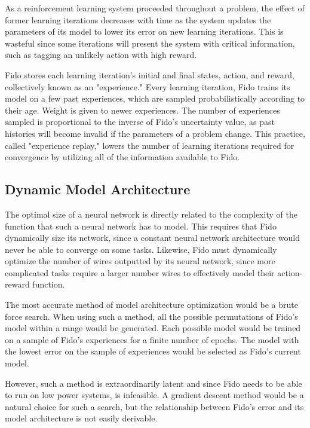 As a reinforcement learning system proceeded throughout a problem, the effect of former learning iterations decreases with time as the system updates the parameters of its model to lower its error on new learning iterations. This is wasteful since some iterations will present the system with critical information, such as tagging an unlikely action with high reward.

Fido stores each learning iteration's initial and final states, action, and reward, collectively known as an "experience." Every learning iteration, Fido trains its model on a few past experiences, which are sampled probabilistically according to their age. Weight is given to newer experiences. The number of experiences sampled is proportional to the inverse of Fido's uncertainty value, as past histories will become invalid if the parameters of a problem change. This practice, called "experience replay," lowers the number of learning iterations required for convergence by utilizing all of the information available to Fido.

\subsection{Dynamic Model Architecture}

The optimal size of a neural network is directly related to the complexity of the function that such a neural network has to model. This requires that Fido dynamically size its network, since a constant neural network architecture would never be able to converge on some tasks. Likewise, Fido must dynamically optimize the number of wires outputted by its neural network, since more complicated tasks require a larger number wires to effectively model their action-reward function.

The most accurate method of model architecture optimization would be a brute force search. When using such a method, all the possible permutations of Fido's model within a range would be generated. Each possible model would be trained on a sample of Fido's experiences for a finite number of epochs. The model with the lowest error on the sample of experiences would be selected as Fido's current model.

However, such a method is extraordinarily latent and since Fido needs to be able to run on low power systems, is infeasible. A gradient descent method would be a natural choice for such a search, but the relationship between Fido's error and its model architecture is not easily derivable.

